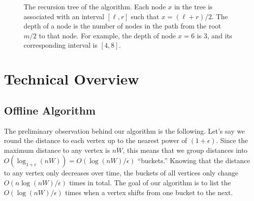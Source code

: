 \documentclass[11pt]{article}
\begin{document}
\begin{figure}
    \centering
    \vspace{-.15in}
    \caption{The recursion tree of the algorithm. Each node $x$ in the tree is associated with an interval $[\ell,r]$ such that $x=(\ell+r)/2$. The depth of a node is the number of nodes in the path from the root $m/2$ to that node. For example, the depth of node $x=6$ is 3, and its corresponding interval is $[4,8]$.}
    \label{fig:tree}
    \vspace{-.15in}
\end{figure}
 \section{Technical Overview}
\label{sec:technical}

\subsection{Offline Algorithm}
The preliminary observation behind our algorithm is the following. Let's say we round the distance to each vertex up to the nearest power of $(1 + \epsilon)$.  Since the maximum distance to any vertex is $nW$, this means that we group distances into $O(\log_{1 + \epsilon} (nW)) = O(\log (nW)/\epsilon)$ ``buckets.''  Knowing that the distance to any vertex only decreases over time, the buckets of all vertices only change $O(n\log (nW)/\epsilon)$ times in total.  The goal of our algorithm is to list the $O(\log (nW)/\epsilon)$ times when a vertex shifts from one bucket to the next.
\end{document}
